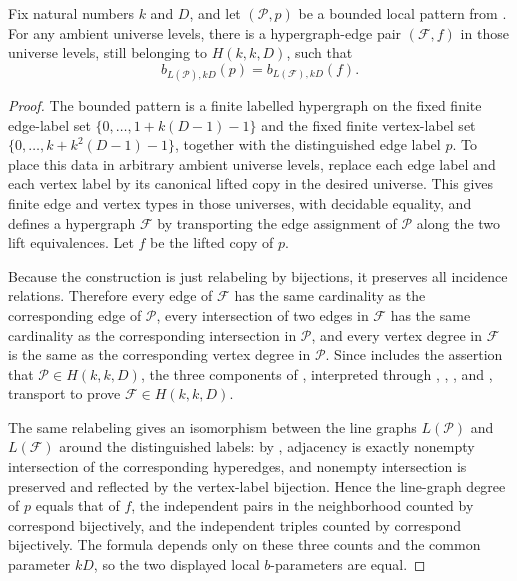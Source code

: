 \begin{helper}
Fix natural numbers $k$ and $D$, and let $(\mathcal P,p)$ be a bounded
local pattern from .  For any
ambient universe levels, there is a hypergraph-edge pair
$(\mathcal F,f)$ in those universe levels, still belonging to $H(k,k,D)$,
such that
\[
b_{L(\mathcal P),kD}(p)=b_{L(\mathcal F),kD}(f).
\]
\end{helper}
\begin{proof}
The bounded pattern  is a
finite labelled hypergraph on the fixed finite edge-label set
$\{0,\ldots,1+k(D-1)-1\}$ and the fixed finite vertex-label set
$\{0,\ldots,k+k^2(D-1)-1\}$, together with the distinguished edge label
$p$.  To place this data in arbitrary ambient universe levels, replace each
edge label and each vertex label by its canonical lifted copy in the desired
universe.  This gives finite edge and vertex types in those universes, with
decidable equality, and defines a hypergraph $\mathcal F$ by transporting
the edge assignment of $\mathcal P$ along the two lift equivalences.  Let
$f$ be the lifted copy of $p$.

Because the construction is just relabeling by bijections, it preserves all
incidence relations.  Therefore every edge of $\mathcal F$ has the same
cardinality as the corresponding edge of $\mathcal P$, every intersection
of two edges in $\mathcal F$ has the same cardinality as the corresponding
intersection in $\mathcal P$, and every vertex degree in $\mathcal F$ is
the same as the corresponding vertex degree in $\mathcal P$.  Since
 includes the assertion that
$\mathcal P\in H(k,k,D)$, the three components of
, interpreted through ,
, , and
, transport to prove
$\mathcal F\in H(k,k,D)$.

The same relabeling gives an isomorphism between the line graphs
$L(\mathcal P)$ and $L(\mathcal F)$ around the distinguished labels:
by , adjacency is exactly nonempty
intersection of the corresponding hyperedges, and nonempty intersection is
preserved and reflected by the vertex-label bijection.  Hence the
line-graph degree of $p$ equals that of $f$, the independent pairs in the
neighborhood counted by  correspond
bijectively, and the independent triples counted by
 correspond bijectively.  The formula
 depends only on these three counts and the common
parameter $kD$, so the two displayed local $b$-parameters are equal.
\end{proof}
